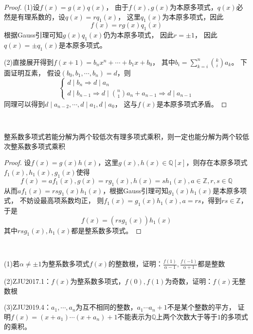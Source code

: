 \begin{proof}
  (1)设$f(x) = g(x)q(x)$，
  由于$f(x),g(x)$为本原多项式，$q(x)$必然是有理系数的，设$q(x) = rq_1(x)$，
  这里$q_1(x)$为本原多项式，因此
  \begin{equation*}
    f(x) = rg(x)q_1(x)
  \end{equation*}
  根据Gauss引理可知$g(x)q_1(x)$仍为本原多项式，
  因此$r = \pm 1$，
  因此$q(x) = \pm q_1(x)$是本原多项式。

  (2)直接展开得到$f(x+1) = b_nx^n + \cdots + b_1x + b_0$，
  其中$b_i = \sum\limits_{k = i}^n {k \choose i}a_k$。
  下面证明互素，
  假设$(b_0,b_1,\cdots,b_n) = d$，则
  \begin{equation*}
    \begin{cases}
      d \mid b_n \Rightarrow d \mid a_n\\
      d \mid b_{n-1} \Rightarrow d \mid {n \choose 1}a_n + a_{n-1} \Rightarrow d \mid a_{n-1}
    \end{cases}
  \end{equation*}
  同理可以得到$d \mid a_{n-2},\cdots,d \mid a_1, d \mid a_0$，
  这与$f(x)$是本原多项式矛盾。
\end{proof}

~

\begin{theorem}[整系数多项式因式分解]
  整系数多项式若能分解为两个较低次有理多项式乘积，则一定也能分解为两个较低次整系数多项式乘积
\end{theorem}

\begin{proof}
  设$f(x) = g(x)h(x)$，这里$g(x),h(x) \in \mathbb{Q}[x]$，则存在本原多项式$f_1(x),h_1(x),g_1(x)$使得
  \begin{equation*}
    f(x) = af_1(x), g(x) = rg_1(x), h(x) = sh_1(x), a \in \mathbb{Z}, r,s \in \mathbb{Q}
  \end{equation*}
  从而$af_1(x) = rsg_1(x)h_1(x)$，根据Gauss引理可知$g_1(x)h_1(x)$是本原多项式，
  不妨设最高项系数均正，
  则$f_1(x) = g_1(x)h_1(x), a = rs$，得到$rs \in \mathbb{Z}$，
  于是
  \begin{equation*}
    f(x) = (rsg_1(x))h_1(x)
  \end{equation*}
  其中$rsg_1(x),h_1(x)$都是整系数多项式。
\end{proof}

~

\begin{exercise}[整系数多项式整数根]
  (1)若$\alpha \neq \pm 1$为整系数多项式$f(x)$的整数根，证明：$\frac{f(1)}{\alpha - 1}, \frac{f(-1)}{\alpha + 1}$都是整数
  
  (2)ZJU2017.1：$f(x)$为整系数多项式，$f(0),f(1)$为奇数，证明：$f(x)$无整数根

  (3)ZJU2019.4：$a_1,\cdots,a_n$为互不相同的整数，$a_1\cdots a_n + 1$不是某个整数的平方，
  证明$f(x) = (x+a_1)\cdots (x+a_n) + 1$不能表示为$\mathbb{Q}$上两个次数大于等于$1$的多项式的乘积。
\end{exercise}

